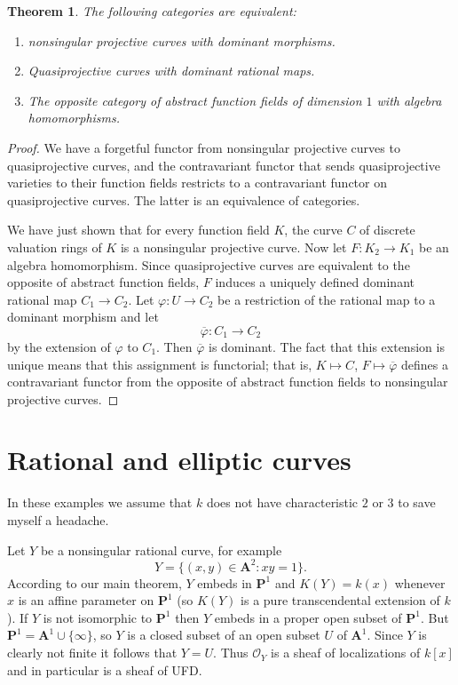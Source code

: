\documentclass[reqno,12pt,letterpaper]{amsart}
\newcommand{\PP}{\mathbf P}
\newcommand{\Aff}{\mathbf A}
\newcommand{\Olo}{\mathscr O}
\newtheorem{theorem}{Theorem}[section]
\theoremstyle{definition}
\begin{document}
\begin{theorem}
The following categories are equivalent:
\begin{enumerate}
\item nonsingular projective curves with dominant morphisms.
\item Quasiprojective curves with dominant rational maps.
\item The opposite category of abstract function fields of dimension $1$ with algebra homomorphisms.
\end{enumerate}
\end{theorem}
\begin{proof}
We have a forgetful functor from nonsingular projective curves to quasiprojective curves, and the contravariant functor that sends quasiprojective varieties to their function fields restricts to a contravariant functor on quasiprojective curves.
The latter is an equivalence of categories.

We have just shown that for every function field $K$, the curve $C$ of discrete valuation rings of $K$ is a nonsingular projective curve.
Now let $F: K_2 \to K_1$ be an algebra homomorphism.
Since quasiprojective curves are equivalent to the opposite of abstract function fields, $F$ induces a uniquely defined dominant rational map $C_1 \to C_2$.
Let $\varphi: U \to C_2$ be a restriction of the rational map to a dominant morphism and let
$$\overline \varphi: C_1 \to C_2$$
by the extension of $\varphi$ to $C_1$.
Then $\overline \varphi$ is dominant. The fact that this extension is unique means that this assignment is functorial; that is, $K \mapsto C$, $F \mapsto \overline \varphi$ defines a contravariant functor from the opposite of abstract function fields to nonsingular projective curves.
\end{proof}

\section{Rational and elliptic curves}
In these examples we assume that $k$ does not have characteristic $2$ or $3$ to save myself a headache.

Let $Y$ be a nonsingular rational curve, for example
$$Y = \{(x, y) \in \Aff^2: xy = 1\}.$$
According to our main theorem, $Y$ embeds in $\PP^1$ and $K(Y) = k(x)$ whenever $x$ is an affine parameter on $\PP^1$ (so $K(Y)$ is a pure transcendental extension of $k$).
If $Y$ is not isomorphic to $\PP^1$ then $Y$ embeds in a proper open subset of $\PP^1$.
But $\PP^1 = \Aff^1 \cup \{\infty\}$, so $Y$ is a closed subset of an open subset $U$ of $\Aff^1$.
Since $Y$ is clearly not finite it follows that $Y = U$.
Thus $\Olo_Y$ is a sheaf of localizations of $k[x]$ and in particular is a sheaf of UFD.
\end{document}
